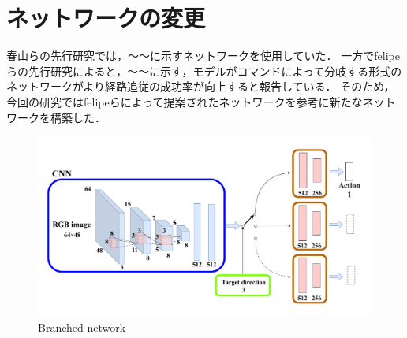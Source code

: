 \section{ネットワークの変更}
春山らの先行研究では，～～に示すネットワークを使用していた．
一方でfelipeらの先行研究によると，～～に示す，モデルがコマンドによって分岐する形式のネットワークがより経路追従の成功率が向上すると報告している．
そのため，今回の研究ではfelipeらによって提案されたネットワークを参考に新たなネットワークを構築した．

\begin{figure}[htbp]
  \centering
   \includegraphics[width=130mm]{images/pdf/ishiguro/branched.pdf}
   \caption{Branched network}
   \label{fig:branched}
\end{figure}